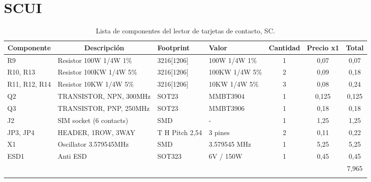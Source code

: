\newpage
\section{SCUI}
\begin{longtable}{|l|p{2.5cm}|p{2cm}|p{2cm}|c|c|c|}
\hline
\multicolumn{1}{|c|}{\textbf{Componente}} & \multicolumn{1}{c|}{\textbf{Descripción}} & \textbf{ Footprint} & \textbf{Valor} & \textbf{Cantidad} & \textbf{Precio x1} & \textbf{Total} \\ \hline
R9 & Resistor 100W 1/4W 1\%  & 3216[1206] & 100W 1/4W  1\% & 1 & 0,07 & 0,07 \\ \hline
R10, R13 & Resistor 100KW 1/4W 5\%  & 3216[1206] & 100KW 1/4W   5\% & 2 & 0,09 & 0,18 \\ \hline
R11, R12, R14 & Resistor 10KW 1/4W 5\%  & 3216[1206] & 10KW 1/4W   5\% & 3 & 0,08 & 0,24 \\ \hline
Q2 & TRANSISTOR, NPN, 300MHz & SOT23 & MMBT3904 & 1 & 0,125 & 0,125 \\ \hline
Q3 & TRANSISTOR, PNP, 250MHz & SOT23 & MMBT3906 & 1 & 0,18 & 0,18 \\ \hline
J2 & SIM socket (6 contacts) & SMD & - & 1 & 1,25 & 1,25 \\ \hline
JP3, JP4 & HEADER, 1ROW, 3WAY & T H Pitch 2,54 & 3 pines & 2 & 0,11 & 0,22 \\ \hline
X1 & Oscillator 3.579545MHz & SMD & 3.579545 MHz & 1 & 5,25 & 5,25 \\ \hline
ESD1 & Anti ESD & SOT323 & 6V / 150W & 1 & 0,45 & 0,45 \\ \hline
 &  & \multicolumn{1}{l|}{} & \multicolumn{1}{l|}{} & \multicolumn{1}{l|}{} & \multicolumn{1}{l|}{} & 7,965 \\ \hline
\caption{Lista de componentes del lector de tarjetas de contacto, SC.}
\label{}
\end{longtable}

